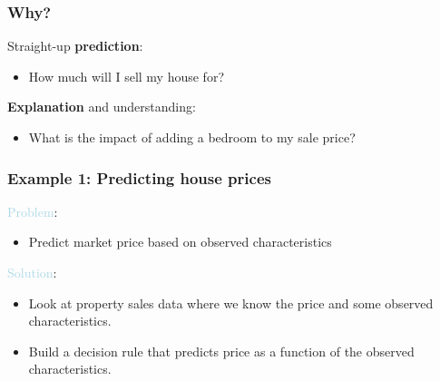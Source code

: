 \documentclass{beamer}
\newcommand{\bo}[1]{\textcolor{burntorange}{#1}}
\newcommand{\lb}[1]{\textcolor{lightblue}{#1}}
\newcommand{\bl}{\color{lightblue}}
\newcommand{\rd}{\color{burntorange}}
\newcommand{\bk}{\color{black}}
\newcommand{\bi}{\begin{itemize}}
\newcommand{\ib}{\end{itemize}}
\newcommand{\p}{\item}
\newcommand{\sk}{\vspace{.5cm}}
\begin{document}
%
%
%
\begin{frame}
\frametitle{Why?} \vspace{-0.5cm}


Straight-up \bo{ \bf prediction}:
\bi
\item How much will I sell my house for?
\ib
\sk
\sk 

\bo{ \bf Explanation} and understanding:
\bi
\item What is the impact of adding a bedroom to my sale price?
\ib

\end{frame}



\begin{frame}
\frametitle{Example 1: Predicting house prices} \vspace{-0.5cm}

{\lb {Problem}:}
\bi \p
Predict market price based on observed characteristics\ib
\sk
\sk

{\lb {Solution}:}
\bi \p Look at property sales data where we know the price and some observed characteristics.
\p Build a decision rule that predicts price as a function of the observed characteristics.
\ib

\end{frame}

\end{document}
